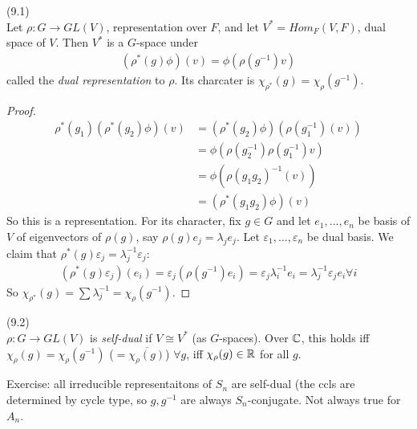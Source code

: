 \documentclass[a4paper]{article}
\begin{document}
\begin{lemma} (9.1)\\
Let $\rho:G \to GL(V)$, representation over $F$, and let $V^* = Hom_F (V,F)$, dual space of $V$. Then $V^*$ is a $G$-space under 
\begin{equation*}
\begin{aligned}
(\rho^*(g)\phi)(v) = \phi(\rho(g^{-1})v)
\end{aligned}
\end{equation*}
called the \emph{dual representation} to $\rho$. Its charcater is $\chi_{\rho^*}(g) = \chi_\rho (g^{-1})$.
\begin{proof}
\begin{equation*}
\begin{aligned}
\rho^*(g_1) (\rho^*(g_2)\phi)(v) &= (\rho^*(g_2)\phi)(\rho(g_1^{-1})(v))\\
&= \phi(\rho(g_2^{-1}) \rho(g_1^{-1}) v)\\
&= \phi(\rho(g_1g_2)^{-1}(v))\\
&= (\rho^*(g_1g_2)\phi)(v)
\end{aligned}
\end{equation*}
So this is a representation. For its character, fix $g \in G$ and let $e_1,...,e_n$ be basis of $V$ of eigenvectors of $\rho(g)$, say $\rho(g) e_j = \lambda_j e_j$. Let $\varepsilon_1,...,\varepsilon_n$ be dual basis. We claim that $\rho^*(g) \varepsilon_j =\lambda^{-1}_j \varepsilon_j$:
\begin{equation*}
\begin{aligned}
(\rho^*(g)\varepsilon_j)(e_i) = \varepsilon_j(\rho(g^{-1})e_i) = \varepsilon_j\lambda_i^{-1}e_i = \lambda_j^{-1} \varepsilon_j e_i \forall i
\end{aligned}
\end{equation*}
So $\chi_{\rho^*}(g) = \sum \lambda_j^{-1}  = \chi_\rho(g^{-1})$.
\end{proof}
\end{lemma}

\begin{defi} (9.2)\\
$\rho:G \to GL(V)$ is \emph{self-dual} if $V \cong V^*$ (as $G$-spaces). Over $\mathbb{C}$, this holds iff $\chi_\rho(g) = \chi_\rho(g^{-1})$ ($=\overline{\chi_\rho(g)}$) $\forall g$, iff $\chi_\rho(g) \in \mathbb{R}$ for all $g$.
\end{defi}

Exercise: all irreducible representaitons of $S_n$ are self-dual (the ccls are determined by cycle type, so $g,g^{-1}$ are always $S_n$-conjugate. Not always true for $A_n$.
\end{document}
